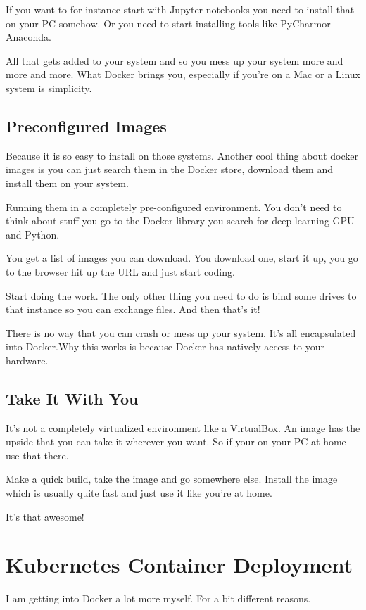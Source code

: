 \documentclass[12pt, numbers=noenddot]{scrreprt} %
\begin{document}
If you want to for instance start with Jupyter notebooks you need to install that on your PC somehow. Or you need to start installing tools like PyCharmor Anaconda.

All that gets added to your system and so you mess up your system more and more and more. What Docker brings you, especially if you’re on a Mac or a Linux system is simplicity.

\subsection{Preconfigured Images}

Because it is so easy to install on those systems. Another cool thing about docker images is you can just search them in the Docker store, download them and install them on your system.

Running them in a completely pre-configured environment. You don’t need to think about stuff you go to the Docker library you search for deep learning GPU and Python.

You get a list of images you can download. You download one, start it up, you go to the browser hit up the URL and just start coding.

Start doing the work. The only other thing you need to do is bind some drives to that instance so you can exchange files. And then that’s it!

There is no way that you can crash or mess up your system. It’s all encapsulated into Docker.Why this works is because Docker has natively access to your hardware.

\subsection{Take It With You}

It’s not a completely virtualized environment like a VirtualBox. An image has the upside that you can take it wherever you want. So if your on your PC at home use that there.

Make a quick build, take the image and go somewhere else. Install the image which is usually quite fast and just use it like you’re at home.

It’s that awesome!

\section{Kubernetes Container Deployment}

I am getting into Docker a lot more myself. For a bit different reasons.
\end{document}
